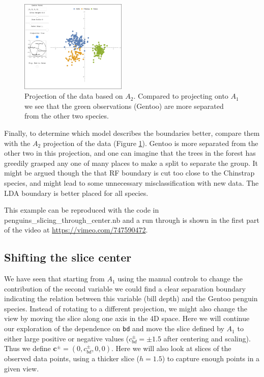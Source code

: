 \documentclass[]{interact}
\theoremstyle{plain}%
\theoremstyle{definition}
\theoremstyle{remark}
\begin{document}
\begin{figure}[ht]
\centerline{\includegraphics[width=0.45\textwidth]{figures/proj2_data.png}}
\caption{Projection of the data based on $A_2$. Compared to projecting onto $A_1$ we see that the green observations (Gentoo) are more separated from the other two species.}
\label{proj2}
\end{figure}

Finally, to determine which model describes the boundaries better,
compare them with the \(A_2\) projection of the data (Figure
\ref{proj2}). Gentoo is more separated from the other two in this
projection, and one can imagine that the trees in the forest has
greedily grasped any one of many places to make a split to separate the
group. It might be argued though the that RF boundary is cut too close
to the Chinstrap species, and might lead to some unnecessary
misclassification with new data. The LDA boundary is better placed for
all species.

This example can be reproduced with the code in
penguins\_slicing\_through\_center.nb and a run through is shown in the
first part of the video at \url{https://vimeo.com/747590472}.

\hypertarget{shifting-the-slice-center}{%
\subsection{Shifting the slice center}\label{shifting-the-slice-center}}

We have seen that starting from \(A_1\) using the manual controls to
change the contribution of the second variable we could find a clear
separation boundary indicating the relation between this variable (bill
depth) and the Gentoo penguin species. Instead of rotating to a
different projection, we might also change the view by moving the slice
along one axis in the 4D space. Here we will continue our exploration of
the dependence on \texttt{bd} and move the slice defined by \(A_1\) to
either large positive or negative values (\(c^{\pm}_{bd} = \pm 1.5\)
after centering and scaling). Thus we define
\(\mathbf{c}^{\pm} = (0, c^{\pm}_{bd}, 0, 0)\). Here we will also look
at slices of the observed data points, using a thicker slice (\(h=1.5\))
to capture enough points in a given view.
\end{document}
